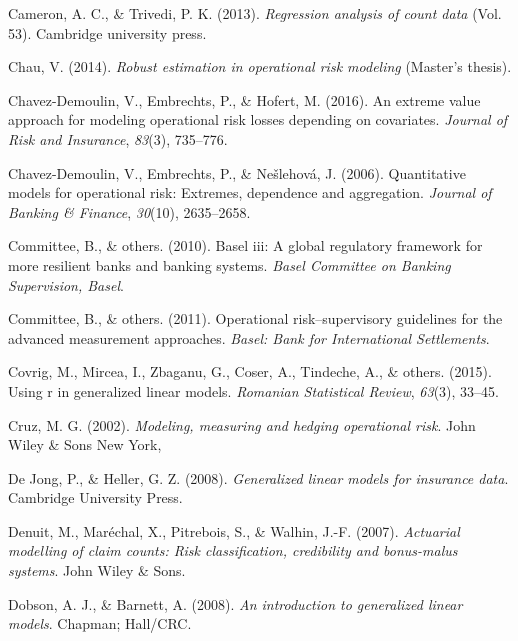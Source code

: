 \documentclass{DissertateUSU}
\begin{document}
\leavevmode\hypertarget{ref-cameron2013regression}{}%
Cameron, A. C., \& Trivedi, P. K. (2013). \emph{Regression analysis of
count data} (Vol. 53). Cambridge university press.

\leavevmode\hypertarget{ref-chau2014robust}{}%
Chau, V. (2014). \emph{Robust estimation in operational risk modeling}
(Master's thesis).

\leavevmode\hypertarget{ref-chavez2016extreme}{}%
Chavez-Demoulin, V., Embrechts, P., \& Hofert, M. (2016). An extreme
value approach for modeling operational risk losses depending on
covariates. \emph{Journal of Risk and Insurance}, \emph{83}(3),
735--776.

\leavevmode\hypertarget{ref-chavez2006quantitative}{}%
Chavez-Demoulin, V., Embrechts, P., \& Nešlehová, J. (2006).
Quantitative models for operational risk: Extremes, dependence and
aggregation. \emph{Journal of Banking \& Finance}, \emph{30}(10),
2635--2658.

\leavevmode\hypertarget{ref-basel2010basel}{}%
Committee, B., \& others. (2010). Basel iii: A global regulatory
framework for more resilient banks and banking systems. \emph{Basel
Committee on Banking Supervision, Basel}.

\leavevmode\hypertarget{ref-basel2011operational}{}%
Committee, B., \& others. (2011). Operational risk--supervisory
guidelines for the advanced measurement approaches. \emph{Basel: Bank
for International Settlements}.

\leavevmode\hypertarget{ref-covrig2015using}{}%
Covrig, M., Mircea, I., Zbaganu, G., Coser, A., Tindeche, A., \& others.
(2015). Using r in generalized linear models. \emph{Romanian Statistical
Review}, \emph{63}(3), 33--45.

\leavevmode\hypertarget{ref-cruz2002modeling}{}%
Cruz, M. G. (2002). \emph{Modeling, measuring and hedging operational
risk}. John Wiley \& Sons New York,

\leavevmode\hypertarget{ref-de2008generalized}{}%
De Jong, P., \& Heller, G. Z. (2008). \emph{Generalized linear models
for insurance data}. Cambridge University Press.

\leavevmode\hypertarget{ref-denuit2007actuarial}{}%
Denuit, M., Maréchal, X., Pitrebois, S., \& Walhin, J.-F. (2007).
\emph{Actuarial modelling of claim counts: Risk classification,
credibility and bonus-malus systems}. John Wiley \& Sons.

\leavevmode\hypertarget{ref-dobson2008introduction}{}%
Dobson, A. J., \& Barnett, A. (2008). \emph{An introduction to
generalized linear models}. Chapman; Hall/CRC.
\end{document}
